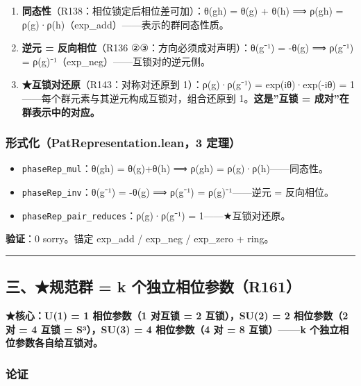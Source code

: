 \documentclass[
]{article}
\providecommand{\tightlist}{%
 \setlength{\itemsep}{0pt}\setlength{\parskip}{0pt}}
\begin{document}
\begin{enumerate}
\def\labelenumi{\arabic{enumi}.}
\tightlist
\item
 \textbf{同态性}（R138：相位锁定后相位差可加）：θ(gh) = θ(g) + θ(h) ⟹
 ρ(gh) = ρ(g)·ρ(h)（exp\_add）------表示的群同态性质。
\item
 \textbf{逆元 = 反向相位}（R136 ②③：方向必须成对声明）：θ(g⁻¹) = -θ(g)
 ⟹ ρ(g⁻¹) = ρ(g)⁻¹（exp\_neg）------互锁对的逆元侧。
\item
 \textbf{★互锁对还原}（R143：对称对还原到 1）：ρ(g)·ρ(g⁻¹) =
 exp(iθ)·exp(-iθ) = 1------每个群元素与其逆元构成互锁对，组合还原到
 1。\textbf{这是''互锁 = 成对''在群表示中的对应。}
\end{enumerate}

\subsubsection{形式化（PatRepresentation.lean，3
定理）}\label{ux5f62ux5f0fux5316patrepresentation.lean3-ux5b9aux7406-1}

\begin{itemize}
\tightlist
\item
 \texttt{phaseRep\_mul}：θ(gh) = θ(g)+θ(h) ⟹ ρ(gh) =
 ρ(g)·ρ(h)------同态性。
\item
 \texttt{phaseRep\_inv}：θ(g⁻¹) = -θ(g) ⟹ ρ(g⁻¹) = ρ(g)⁻¹------逆元 =
 反向相位。
\item
 \texttt{phaseRep\_pair\_reduces}：ρ(g)·ρ(g⁻¹) = 1------★互锁对还原。
\end{itemize}

\textbf{验证}：0 sorry。锚定 exp\_add / exp\_neg / exp\_zero + ring。

\begin{center}\rule{0.5\linewidth}{0.5pt}\end{center}

\subsection{三、★规范群 = k
个独立相位参数（R161）}\label{ux4e09ux89c4ux8303ux7fa4-k-ux4e2aux72ecux7acbux76f8ux4f4dux53c2ux6570r161}

\textbf{★核心：U(1) = 1 相位参数（1 对互锁 = 2 互锁），SU(2) = 2
相位参数（2 对 = 4 互锁 = S³），SU(3) = 4 相位参数（4 对 = 8
互锁）------k 个独立相位参数各自给互锁对。}

\subsubsection{论证}\label{ux8bbaux8bc1-2}
\end{document}
